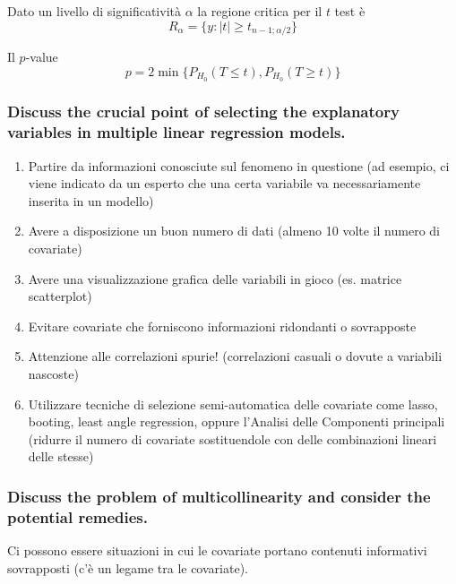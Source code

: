 \documentclass[
]{article}
\begin{document}
Dato un livello di significatività \(\alpha\) la regione critica per il
\(t\) test è \[R_\alpha = \{ y:|t|\geq t_{n-1;\alpha/2} \}\]

Il \(p\)-value
\[ p = 2\min\{ P_{H_0} (T \leq t), P_{H_0} (T \geq t) \} \]

\hypertarget{discuss-the-crucial-point-of-selecting-the-explanatory-variables-in-multiple-linear-regression-models.}{%
\subsubsection{Discuss the crucial point of selecting the explanatory
variables in multiple linear regression
models.}\label{discuss-the-crucial-point-of-selecting-the-explanatory-variables-in-multiple-linear-regression-models.}}

\begin{enumerate}
\def\labelenumi{\arabic{enumi}.}
\item
  Partire da informazioni conosciute sul fenomeno in questione (ad
  esempio, ci viene indicato da un esperto che una certa variabile va
  necessariamente inserita in un modello)
\item
  Avere a disposizione un buon numero di dati (almeno 10 volte il numero
  di covariate)
\item
  Avere una visualizzazione grafica delle variabili in gioco (es.
  matrice scatterplot)
\item
  Evitare covariate che forniscono informazioni ridondanti o sovrapposte
\item
  Attenzione alle correlazioni spurie! (correlazioni casuali o dovute a
  variabili nascoste)
\item
  Utilizzare tecniche di selezione semi-automatica delle covariate come
  lasso, booting, least angle regression, oppure l'Analisi delle
  Componenti principali (ridurre il numero di covariate sostituendole
  con delle combinazioni lineari delle stesse)
\end{enumerate}

\hypertarget{discuss-the-problem-of-multicollinearity-and-consider-the-potential-remedies.}{%
\subsubsection{Discuss the problem of multicollinearity and consider the
potential
remedies.}\label{discuss-the-problem-of-multicollinearity-and-consider-the-potential-remedies.}}

Ci possono essere situazioni in cui le covariate portano contenuti
informativi sovrapposti (c'è un legame tra le covariate).
\end{document}
